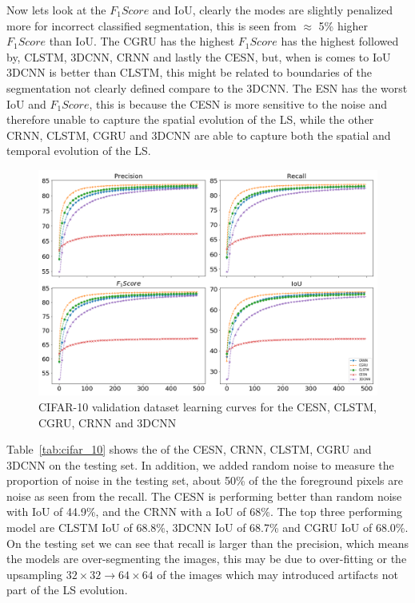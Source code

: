 \documentclass{WitsPhysicsReport}
\begin{document}
Now lets look at the $F_{1}Score$ and IoU, clearly the modes are slightly penalized more for incorrect classified segmentation, this is seen from $\approx$ 5\% higher $F_{1}Score$ than IoU. The CGRU has the highest $F_{1}Score$ has the highest  followed by, CLSTM, 3DCNN, CRNN and lastly the CESN, but, when is comes to IoU 3DCNN is better than CLSTM, this might be related to boundaries of the segmentation not clearly defined compare to the 3DCNN. The ESN has the worst IoU and $F_{1}Score$, this is because the CESN is more sensitive to the noise and therefore unable to capture the spatial evolution of the LS, while the other CRNN, CLSTM, CGRU and 3DCNN are able to capture both the spatial and temporal evolution of the LS.

\begin{figure}[H]
\centering
  \includegraphics[width=1\textwidth]{Figure/Results/CIFAR_10_performance.png}
\caption{CIFAR-10 validation dataset learning curves for the CESN, CLSTM, CGRU, CRNN and 3DCNN}
 \label{fig:cifar_10_model_perfomance}
\end{figure}

Table~\ref{tab:cifar_10} shows the of the CESN, CRNN, CLSTM, CGRU and 3DCNN on the testing set. In addition, we added random noise to measure the proportion of noise in the testing set, about 50\% of the the foreground pixels are noise as seen from the recall. The CESN is performing better than random noise with IoU of 44.9\%, and the CRNN with a IoU of 68\%. The top three performing model are CLSTM IoU of 68.8\%, 3DCNN IoU of 68.7\% and CGRU IoU of 68.0\%. On the testing set we can see that recall is larger than the precision, which means the models are over-segmenting the images, this may be due to over-fitting or the upsampling $32\times32 \rightarrow 64\times64$ of the images which may introduced artifacts not part of the LS evolution.
 
\end{document}
